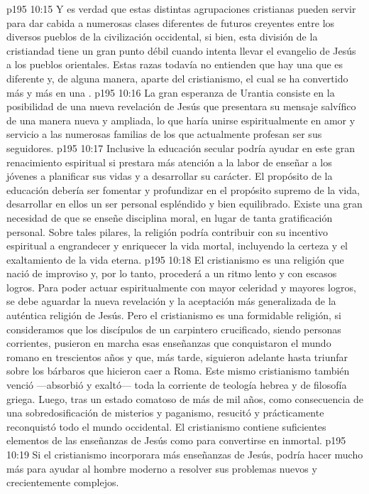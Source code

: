 \vs p195 10:15 Y es verdad que estas distintas agrupaciones cristianas pueden servir para dar cabida a numerosas clases diferentes de futuros creyentes entre los diversos pueblos de la civilización occidental, si bien, esta división de la cristiandad tiene un gran punto débil cuando intenta llevar el evangelio de Jesús a los pueblos orientales. Estas razas todavía no entienden que hay una  que es diferente y, de alguna manera, aparte del cristianismo, el cual se ha convertido más y más en una .
\vs p195 10:16 La gran esperanza de Urantia consiste en la posibilidad de una nueva revelación de Jesús que presentara su mensaje salvífico de una manera nueva y ampliada, lo que haría unirse espiritualmente en amor y servicio a las numerosas familias de los que actualmente profesan ser sus seguidores.
\vs p195 10:17 Inclusive la educación secular podría ayudar en este gran renacimiento espiritual si prestara más atención a la labor de enseñar a los jóvenes a planificar sus vidas y a desarrollar su carácter. El propósito de la educación debería ser fomentar y profundizar en el propósito supremo de la vida, desarrollar en ellos un ser personal espléndido y bien equilibrado. Existe una gran necesidad de que se enseñe disciplina moral, en lugar de tanta gratificación personal. Sobre tales pilares, la religión podría contribuir con su incentivo espiritual a engrandecer y enriquecer la vida mortal, incluyendo la certeza y el exaltamiento de la vida eterna.
\vs p195 10:18 El cristianismo es una religión que nació de improviso y, por lo tanto, procederá a un ritmo lento y con escasos logros. Para poder actuar espiritualmente con mayor celeridad y mayores logros, se debe aguardar la nueva revelación y la aceptación más generalizada de la auténtica religión de Jesús. Pero el cristianismo es una formidable religión, si consideramos que los discípulos de un carpintero crucificado, siendo personas corrientes, pusieron en marcha esas enseñanzas que conquistaron el mundo romano en trescientos años y que, más tarde, siguieron adelante hasta triunfar sobre los bárbaros que hicieron caer a Roma. Este mismo cristianismo también venció ---absorbió y exaltó--- toda la corriente de teología hebrea y de filosofía griega. Luego, tras un estado comatoso de más de mil años, como consecuencia de una sobredosificación de misterios y paganismo, resucitó y prácticamente reconquistó todo el mundo occidental. El cristianismo contiene suficientes elementos de las enseñanzas de Jesús como para convertirse en inmortal.
\vs p195 10:19 Si el cristianismo incorporara más enseñanzas de Jesús, podría hacer mucho más para ayudar al hombre moderno a resolver sus problemas nuevos y crecientemente complejos.
